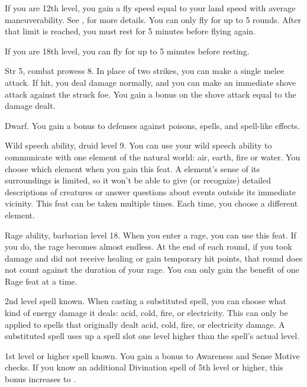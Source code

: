 If you are 12th level, you gain a fly speed equal to your land speed with average maneuverability.
See , for more details.
You can only fly for up to 5 rounds.
After that limit is reached, you must rest for 5 minutes before flying again.

If you are 18th level, you can fly for up to 5 minutes before resting.

\featpres Str 5, combat prowess 8.
\featben In place of two strikes, you can make a single melee attack.
If hit, you deal damage normally, and you can make an immediate shove attack against the struck foe.
You gain a bonus on the shove attack equal to the damage dealt.

\featpre Dwarf.
\featben You gain a  bonus to defenses against poisons, spells, and spell-like effects.

\featpre Wild speech ability, druid level 9.
\featben You can use your wild speech ability to communicate with one element of the natural world: air, earth, fire or water.
You choose which element when you gain this feat.
A element's sense of its surroundings is limited, so it won't be able to give (or recognize) detailed descriptions of creatures or answer questions about events outside its immediate vicinity.
 This feat can be taken multiple times.
Each time, you choose a different element.

\featpre Rage ability, barbarian level 18.
\featben When you enter a rage, you can use this feat. If you do, the rage becomes almost endless. At the end of each round, if you took damage and did not receive healing or gain temporary hit points, that round does not count against the duration of your rage.
 You can only gain the benefit of one Rage feat at a time.

\featpre 2nd level spell known.
\featben When casting a substituted spell, you can choose what kind of energy damage it deals: acid, cold, fire, or electricity.
This can only be applied to spells that originally dealt acid, cold, fire, or electricity damage.
A substituted spell uses up a spell slot one level higher than the spell's actual level.

\featpre 1st level or higher  spell known.
\featben You gain a  bonus to Awareness and Sense Motive checks.
If you know an additional Divination spell of 5th level or higher, this bonus increases to .

